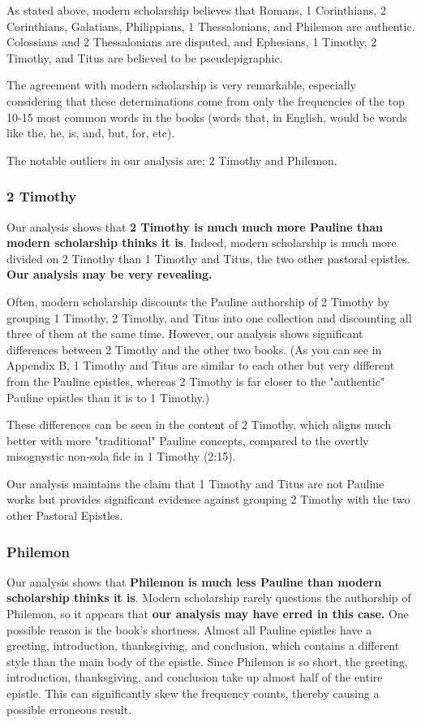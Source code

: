 \documentclass[12pt,letterpaper]{article}
\begin{document}
As stated above, modern scholarship believes that Romans, 1 Corinthians, 2 Corinthians, Galatians, Philippians, 1 Thessalonians, and Philemon are authentic.  Colossians and 2 Thessalonians are disputed, and Ephesians, 1 Timothy, 2 Timothy, and Titus are believed to be pseudepigraphic.  

The agreement with modern scholarship is very remarkable, especially considering that these determinations come from only the frequencies of the top 10-15 most common words in the books (words that, in English, would be words like the, he, is, and, but, for, etc).  

The notable outliers in our analysis are: 2 Timothy and Philemon.  

\subsubsection{2 Timothy}

Our analysis shows that \textbf{2 Timothy is much much more Pauline than modern scholarship thinks it is}.  Indeed, modern scholarship is much more divided on 2 Timothy than 1 Timothy and Titus, the two other pastoral epistles.  \textbf{Our analysis may be very revealing.}

Often, modern scholarship discounts the Pauline authorship of 2 Timothy by grouping 1 Timothy, 2 Timothy, and Titus into one collection and discounting all three of them at the same time.  However, our analysis shows significant differences between 2 Timothy and the other two books.  (As you can see in Appendix B, 1 Timothy and Titus are similar to each other but very different from the Pauline epistles, whereas 2 Timothy is far closer to the "authentic" Pauline epistles than it is to 1 Timothy.)  

These differences can be seen in the content of 2 Timothy, which aligns much better with more "traditional" Pauline concepts, compared to the overtly misognystic non-sola fide in 1 Timothy (2:15).  

Our analysis maintains the claim that 1 Timothy and Titus are not Pauline works but provides significant evidence against grouping 2 Timothy with the two other Pastoral Epistles. 

\subsubsection{Philemon}

Our analysis shows that \textbf{Philemon is much less Pauline than modern scholarship thinks it is}.  Modern scholarship rarely questions the authorship of Philemon, so it appears that \textbf{our analysis may have erred in this case.}  One possible reason is the book's shortness.  Almost all Pauline epistles have a greeting, introduction, thanksgiving, and conclusion, which contains a different style than the main body of the epistle.  Since Philemon is so short, the greeting, introduction, thanksgiving, and conclusion take up almost half of the entire epistle.  This can significantly skew the frequency counts, thereby causing a possible erroneous result.  
\end{document}
